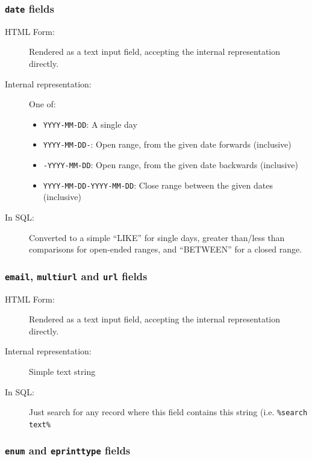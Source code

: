 \subsubsection{{\tt date} fields}

\begin{description}
\item[HTML Form:] Rendered as a text input field, accepting the internal representation directly.

\item[Internal representation:] One of:
\begin{itemize}
\item {\tt YYYY-MM-DD}: A single day
\item {\tt YYYY-MM-DD-}: Open range, from the given date forwards (inclusive)
\item {\tt -YYYY-MM-DD}: Open range, from the given date backwards (inclusive)
\item {\tt YYYY-MM-DD-YYYY-MM-DD}: Close range between the given dates (inclusive)
\end{itemize}

\item[In SQL:] Converted to a simple ``LIKE'' for single days, greater than/less than comparisons for open-ended ranges, and ``BETWEEN'' for a closed range.
\end{description}


\subsubsection{{\tt email}, {\tt multiurl} and {\tt url} fields}

\begin{description}
\item[HTML Form:] Rendered as a text input field, accepting the internal representation directly.

\item[Internal representation:] Simple text string

\item[In SQL:] Just search for any record where this field contains this string (i.e. {\tt \%search text\%}
\end{description}


\subsubsection{{\tt enum} and {\tt eprinttype} fields}

